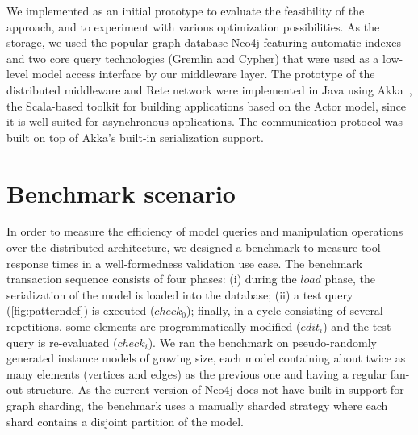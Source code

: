 

We implemented \iqd{} as an initial prototype to evaluate the feasibility of the approach, and to experiment with various optimization possibilities. As the storage, we used the popular graph database Neo4j \cite{neo4j} featuring automatic indexes and two core query technologies (Gremlin and Cypher) that were used as a low-level model access interface by our middleware layer. %
The prototype of the distributed middleware and Rete network were implemented in Java using Akka~\cite{akka}, the Scala-based toolkit for building applications based on the Actor model, since it is well-suited for asynchronous applications. The communication protocol was built on top of Akka's built-in serialization support.






\section{Benchmark scenario}

\label{benchmark}
In order to measure the efficiency of model queries and manipulation operations over the distributed architecture, we designed a benchmark to measure tool response times in a well-formedness validation use case. The benchmark transaction sequence consists of four phases: (i) during the $load$ phase, the serialization of the model is loaded into the database; (ii) a test query (\autoref{fig:patterndef}) is executed ($check_0$); finally, in a cycle consisting of several repetitions, some elements are programmatically modified ($edit_i$) and the test query is re-evaluated ($check_i$). We ran the benchmark on pseudo-randomly generated instance models of growing size, each model containing about twice as many elements (vertices and edges) as the previous one and having a regular fan-out structure. As the current version of Neo4j does not have built-in support for graph sharding, the benchmark uses a manually sharded strategy where each shard contains a disjoint partition of the model.


